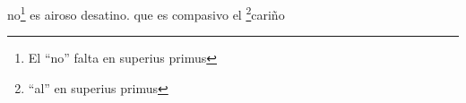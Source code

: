 no\footnote{\textsuperscript{}El ``no'' falta en superius primus} es airoso desatino.
que es compasivo el \footnote{\textsuperscript{}``al'' en superius primus}cariño
